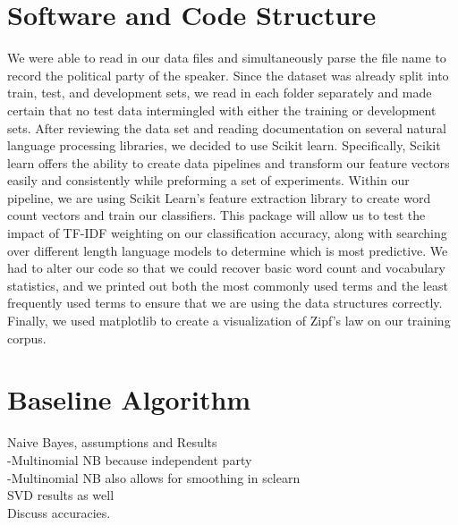 \documentclass[a4paper, 11pt]{article}
\begin{document}
\section{Software and Code Structure}
We were able to read in our data files and simultaneously parse the file name to record the political party of the speaker. Since the dataset was already split into train, test, and development sets, we read in each folder separately and made certain that no test data intermingled with either the training or development sets.  After reviewing the data set and reading documentation on several natural language processing libraries, we decided to use Scikit learn.  Specifically, Scikit learn offers the ability to create data pipelines and transform our feature vectors easily and consistently while preforming a set of experiments. Within our pipeline, we are using Scikit Learn's feature extraction library to create word count vectors and train our classifiers. This package will allow us to test the impact of TF-IDF weighting on our classification accuracy, along with searching over different length language models to determine which is most predictive. We had to alter our code so that we could recover basic word count and vocabulary statistics, and we printed out both the most commonly used terms and the least frequently used terms to ensure that we are using the data structures correctly.  Finally, we used matplotlib to create a visualization of Zipf's law on our training corpus.

\section{Baseline Algorithm}
Naive Bayes, assumptions and Results\\
-Multinomial NB because independent party\\
-Multinomial NB also allows for smoothing in sclearn\\
SVD results as well\\
Discuss accuracies.\\
\end{document}
